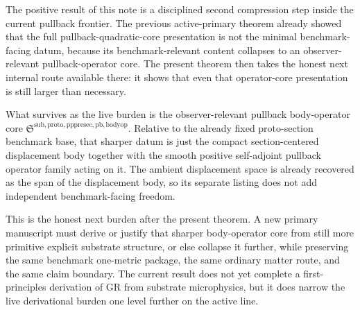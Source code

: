 \documentclass[11pt]{article}
\newcommand{\PullbackBodyOperatorCore}{\mathfrak S^{\mathrm{sub,proto,pppresec,pb,bodyop}}}
\begin{document}
The positive result of this note is a disciplined second compression step inside the current pullback frontier. The previous active-primary theorem already showed that the full pullback-quadratic-core presentation is not the minimal benchmark-facing datum, because its benchmark-relevant content collapses to an observer-relevant pullback-operator core. The present theorem then takes the honest next internal route available there: it shows that even that operator-core presentation is still larger than necessary.

What survives as the live burden is the observer-relevant pullback body-operator core \(\PullbackBodyOperatorCore\). Relative to the already fixed proto-section benchmark base, that sharper datum is just the compact section-centered displacement body together with the smooth positive self-adjoint pullback operator family acting on it. The ambient displacement space is already recovered as the span of the displacement body, so its separate listing does not add independent benchmark-facing freedom.

This is the honest next burden after the present theorem. A new primary manuscript must derive or justify that sharper body-operator core from still more primitive explicit substrate structure, or else collapse it further, while preserving the same benchmark one-metric package, the same ordinary matter route, and the same claim boundary. The current result does not yet complete a first-principles derivation of GR from substrate microphysics, but it does narrow the live derivational burden one level further on the active line.
\end{document}
